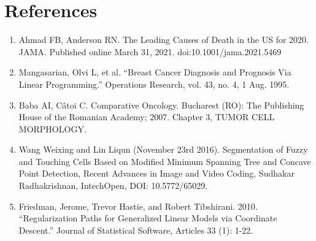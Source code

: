 \documentclass[11pt]{article}
\begin{document}
\section{References}

\begin{enumerate}
	\item Ahmad FB, Anderson RN. The Leading Causes of Death in the US for 2020. JAMA. Published online March 31, 2021. doi:10.1001/jama.2021.5469

	\item Mangasarian, Olvi L, et al. “Breast Cancer Diagnosis and Prognosis Via Linear Programming.” Operations Research, vol. 43, no. 4, 1 Aug. 1995. 
	
	\item Baba AI, Câtoi C. Comparative Oncology. Bucharest (RO): The Publishing House of the Romanian Academy; 2007. Chapter 3, TUMOR CELL MORPHOLOGY. 	
	\item Wang Weixing and Lin Liqun (November 23rd 2016). Segmentation of Fuzzy and Touching Cells Based on Modified Minimum Spanning Tree and Concave Point Detection, Recent Advances in Image and Video Coding, Sudhakar Radhakrishnan, IntechOpen, DOI: 10.5772/65029. 

	\item Friedman, Jerome, Trevor Hastie, and Robert Tibshirani. 2010. “Regularization Paths for Generalized Linear Models via Coordinate Descent.” Journal of Statistical Software, Articles 33 (1): 1-22. 
	
\end{enumerate}
	
	
	
\end{document}
